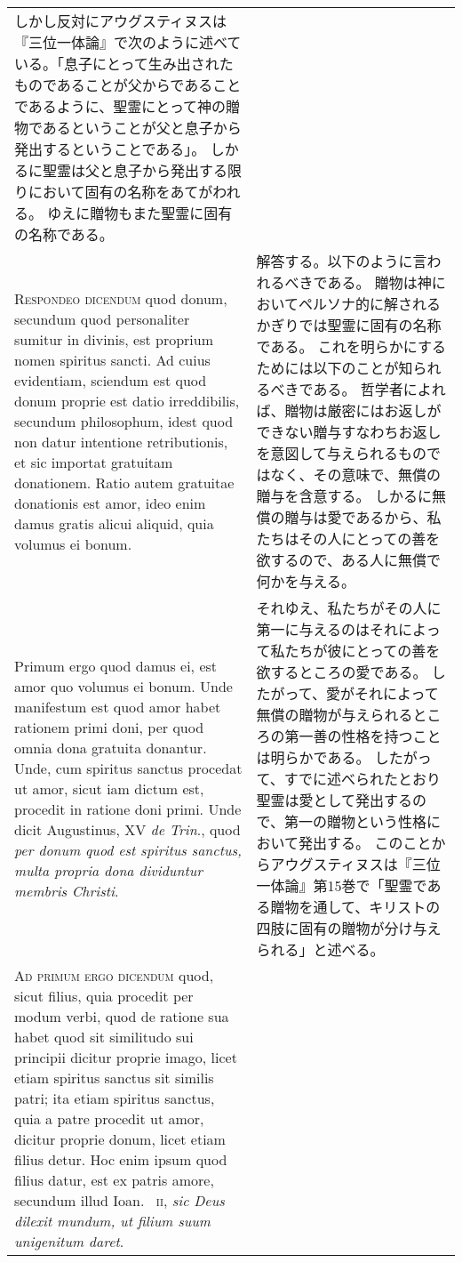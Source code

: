 \documentclass[10pt]{jsarticle} %
\begin{document}
\begin{longtable}{p{21em}p{21em}}
しかし反対にアウグスティヌスは『三位一体論』で次のように述べている。「息子にとって生み出されたものであることが父からであることであるように、聖霊にとって神の贈物であるということが父と息子から発出するということである」。
しかるに聖霊は父と息子から発出する限りにおいて固有の名称をあてがわれる。
ゆえに贈物もまた聖霊に固有の名称である。

\\

\textsc{Respondeo dicendum} quod donum, secundum quod personaliter sumitur in
divinis, est proprium nomen spiritus sancti. Ad cuius evidentiam, sciendum est
quod donum proprie est datio irreddibilis, secundum philosophum, idest quod non
datur intentione retributionis, et sic importat gratuitam donationem. Ratio
autem gratuitae donationis est amor, ideo enim damus gratis alicui aliquid,
quia volumus ei bonum. 

&

解答する。以下のように言われるべきである。
贈物は神においてペルソナ的に解されるかぎりでは聖霊に固有の名称である。
これを明らかにするためには以下のことが知られるべきである。
哲学者によれば、贈物は厳密にはお返しができない贈与すなわちお返しを意図して与えられるものではなく、その意味で、無償の贈与を含意する。
しかるに無償の贈与は愛であるから、私たちはその人にとっての善を欲するので、ある人に無償で何かを与える。
\\

Primum ergo quod damus ei, est amor quo volumus ei
bonum. Unde manifestum est quod amor habet rationem primi doni, per quod omnia
dona gratuita donantur. Unde, cum spiritus sanctus procedat ut amor, sicut iam
dictum est, procedit in ratione doni primi. Unde dicit Augustinus, XV \textit{de Trin}.,
quod \textit{per donum quod est spiritus sanctus, multa propria dona dividuntur membris
Christi}.


&

それゆえ、私たちがその人に第一に与えるのはそれによって私たちが彼にとっての善を欲するところの愛である。
したがって、愛がそれによって無償の贈物が与えられるところの第一善の性格を持つことは明らかである。
したがって、すでに述べられたとおり聖霊は愛として発出するので、第一の贈物という性格において発出する。
このことからアウグスティヌスは『三位一体論』第15巻で「聖霊である贈物を通して、キリストの四肢に固有の贈物が分け与えられる」と述べる。

\\

\textsc{Ad primum ergo dicendum} quod, sicut filius, quia procedit per modum verbi, quod
de ratione sua habet quod sit similitudo sui principii dicitur proprie imago,
licet etiam spiritus sanctus sit similis patri; ita etiam spiritus sanctus,
quia a patre procedit ut amor, dicitur proprie donum, licet etiam filius detur.
Hoc enim ipsum quod filius datur, est ex patris amore, secundum illud Ioan.~
\textsc{ii}, \textit{sic Deus dilexit mundum, ut filium suum unigenitum daret}.



\end{longtable}
\end{document}
